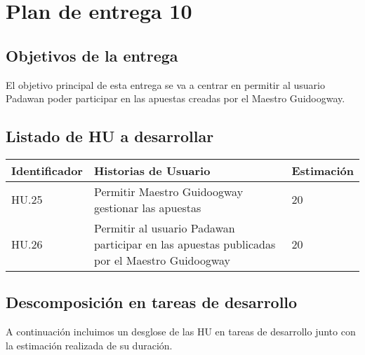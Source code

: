 \section{Plan de entrega 10}

\subsection{Objetivos de la entrega}

El objetivo principal de esta entrega se va a centrar en permitir al usuario Padawan poder participar en las apuestas creadas por el Maestro Guidoogway.

\subsection{Listado de HU a desarrollar}

\begin{table}[h]
	\centering
	\begin{tabular}{| p{2.3cm} | p{6.7cm} | p{2cm} |}
		\rowcolor[HTML]{329A9D} 
		{\color[HTML]{FFFFFF} \textbf{Identificador}} & {\color[HTML]{FFFFFF} \textbf{Historias de Usuario}} & {\color[HTML]{FFFFFF} \textbf{Estimación}}  \\ \hline
		HU.25 & Permitir Maestro Guidoogway gestionar las apuestas & 20 \\ \hline
		HU.26 & Permitir al usuario Padawan participar en las apuestas publicadas por el Maestro Guidoogway & 20 \\ \hline
	\end{tabular}
\end{table}

\newpage

\subsection{Descomposición en tareas de desarrollo}

A continuación incluimos un desglose de las HU en tareas de desarrollo junto con la estimación realizada de su duración.\\

